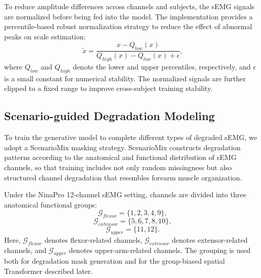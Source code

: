 \documentclass[journal]{IEEEtran}
\begin{document}
To reduce amplitude differences across channels and subjects, the sEMG signals are normalized before being fed into the model. The implementation provides a percentile-based robust normalization strategy to reduce the effect of abnormal peaks on scale estimation:
\begin{equation}
\tilde{x} = \frac{x-Q_{low}(x)}{Q_{high}(x)-Q_{low}(x)+\epsilon},
\end{equation}
where $Q_{low}$ and $Q_{high}$ denote the lower and upper percentiles, respectively, and $\epsilon$ is a small constant for numerical stability. The normalized signals are further clipped to a fixed range to improve cross-subject training stability.

\subsection{Scenario-guided Degradation Modeling}
To train the generative model to complete different types of degraded sEMG, we adopt a ScenarioMix masking strategy. ScenarioMix constructs degradation patterns according to the anatomical and functional distribution of sEMG channels, so that training includes not only random missingness but also structured channel degradation that resembles forearm muscle organization.

Under the NinaPro 12-channel sEMG setting, channels are divided into three anatomical functional groups:
\begin{equation}
\mathcal{G}_{flexor}=\{1,2,3,4,9\},
\end{equation}
\begin{equation}
\mathcal{G}_{extensor}=\{5,6,7,8,10\},
\end{equation}
\begin{equation}
\mathcal{G}_{upper}=\{11,12\}.
\end{equation}
Here, $\mathcal{G}_{flexor}$ denotes flexor-related channels, $\mathcal{G}_{extensor}$ denotes extensor-related channels, and $\mathcal{G}_{upper}$ denotes upper-arm-related channels. The grouping is used both for degradation mask generation and for the group-biased spatial Transformer described later.
\end{document}
